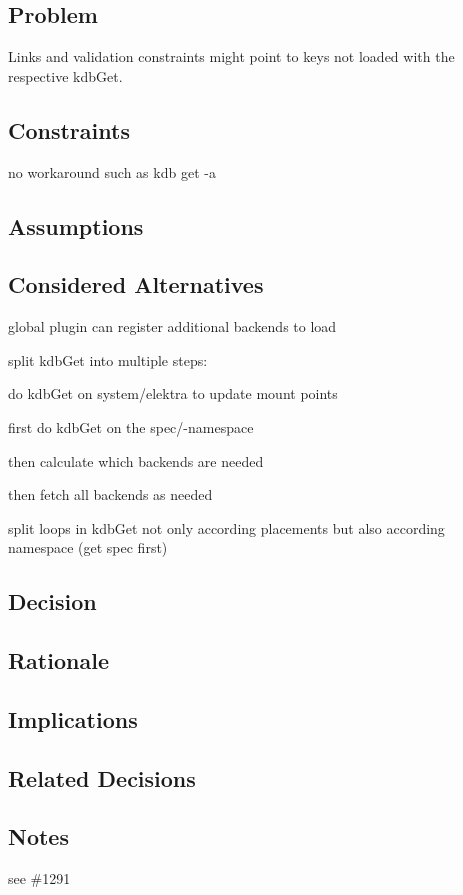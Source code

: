 \subsection*{Problem}

Links and validation constraints might point to keys not loaded with the respective {\ttfamily kdb\+Get}.

\subsection*{Constraints}


\begin{DoxyItemize}
\item no workaround such as {\ttfamily kdb get -\/a}
\end{DoxyItemize}

\subsection*{Assumptions}

\subsection*{Considered Alternatives}


\begin{DoxyItemize}
\item global plugin can register additional backends to load
\item split {\ttfamily kdb\+Get} into multiple steps\+:
\begin{DoxyEnumerate}
\item do {\ttfamily kdb\+Get} on {\ttfamily system/elektra} to update mount points
\item first do {\ttfamily kdb\+Get} on the {\ttfamily spec/}-\/namespace
\item then calculate which backends are needed
\item then fetch all backends as needed
\end{DoxyEnumerate}
\item split loops in {\ttfamily kdb\+Get} not only according placements but also according namespace (get spec first)
\end{DoxyItemize}

\subsection*{Decision}

\subsection*{Rationale}

\subsection*{Implications}

\subsection*{Related Decisions}

\subsection*{Notes}

see \#1291 